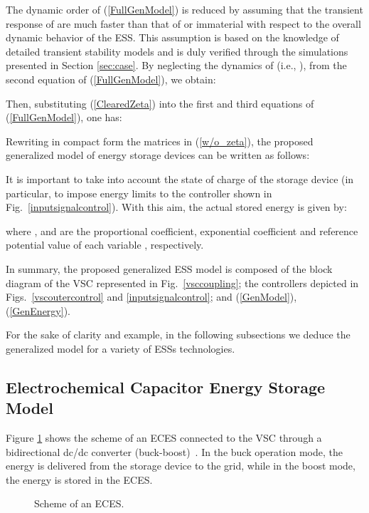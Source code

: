 \documentclass[journal, a4paper]{IEEEtran}
\begin{document}
The dynamic order of (\ref{FullGenModel}) is reduced by assuming that
the transient response of  are much faster than that
of  or immaterial with respect to the overall dynamic
behavior of the ESS.  This assumption is based on the knowledge of
detailed transient stability models and is
duly verified through the simulations presented in Section
\ref{sec:case}.  By neglecting the dynamics of  (i.e.,
), from the second equation of
(\ref{FullGenModel}), we obtain:

Then, substituting (\ref{ClearedZeta}) into the first and third
equations of (\ref{FullGenModel}), one has:


Rewriting in compact form the matrices in (\ref{w/o_zeta}), the
proposed generalized model of energy storage devices can be written as
follows:

It is important to take into account the state of charge of the
storage device (in particular, to impose energy limits to the
controller shown in Fig.~\ref{inputsignalcontrol}). With this aim, 
the actual stored energy is given by:

where ,  and  are the
proportional coefficient, exponential coefficient and reference
potential value of each variable , respectively.

In summary, the proposed generalized ESS model is composed of 
the block diagram of the VSC represented in Fig.~\ref{vsccoupling}; 
the controllers depicted in Figs.~\ref{vscoutercontrol} 
and \ref{inputsignalcontrol}; and (\ref{GenModel}), (\ref{GenEnergy}).

For the sake of clarity and example, in the following subsections we
deduce the generalized model for a variety of ESSs technologies.

\vspace{-2mm}
\subsection{Electrochemical Capacitor Energy Storage Model}
\label{subsec:sces}

Figure \ref{sces} shows the scheme of an ECES connected to the VSC through a bidirectional dc/dc converter
(buck-boost)~\cite{intham:13}.
In the buck operation mode, 
the energy is delivered from the storage device to the grid, 
while in the boost mode, the energy is stored in the ECES.
\begin{figure}[h!]
  \begin{center}
    \psfrag{+}{}
    \psfrag{-}{}
    \caption{Scheme of an ECES.}
    \label{sces}
  \end{center}
\vspace{-0.4cm}
\end{figure}
\end{document}

